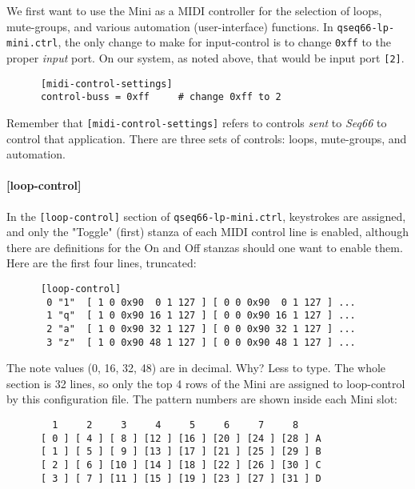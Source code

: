    We first want to use the Mini as a MIDI controller for
   the selection of loops, mute-groups, and various automation (user-interface)
   functions.
   In \texttt{qseq66-lp-mini.ctrl},
   the only change to make for input-control is
   to change \texttt{0xff} to the proper \textsl{input} port.  On our system,
   as noted above, that would be input port \texttt{[2]}.

   \begin{verbatim}
      [midi-control-settings]
      control-buss = 0xff     # change 0xff to 2
   \end{verbatim}

   Remember that \texttt{[midi-control-settings]} refers to controls
   \textsl{sent} to \textsl{Seq66} to control that application.
   There are three sets of controls:  loops, mute-groups, and automation.

\paragraph{[loop-control]}
\label{paragraph:patterns_loop_control}

   In the \texttt{[loop-control]} section of \texttt{qseq66-lp-mini.ctrl},
   keystrokes are assigned, and only the "Toggle" (first)
   stanza of each MIDI control line
   is enabled, although there are definitions for the On and Off stanzas
   should one want to enable them.  Here are the first four lines, truncated:

   \begin{verbatim}
      [loop-control]
       0 "1"  [ 1 0 0x90  0 1 127 ] [ 0 0 0x90  0 1 127 ] ...
       1 "q"  [ 1 0 0x90 16 1 127 ] [ 0 0 0x90 16 1 127 ] ...
       2 "a"  [ 1 0 0x90 32 1 127 ] [ 0 0 0x90 32 1 127 ] ...
       3 "z"  [ 1 0 0x90 48 1 127 ] [ 0 0 0x90 48 1 127 ] ...
   \end{verbatim}

   The note values (0, 16, 32, 48) are in decimal. Why?  Less to type.
   The whole section is 32 lines, so only the top 4 rows of the Mini are
   assigned to loop-control by this configuration file.  The pattern numbers are
   shown inside each Mini slot:

   \begin{verbatim}
        1     2     3     4     5     6     7     8 
      [ 0 ] [ 4 ] [ 8 ] [12 ] [16 ] [20 ] [24 ] [28 ] A
      [ 1 ] [ 5 ] [ 9 ] [13 ] [17 ] [21 ] [25 ] [29 ] B
      [ 2 ] [ 6 ] [10 ] [14 ] [18 ] [22 ] [26 ] [30 ] C
      [ 3 ] [ 7 ] [11 ] [15 ] [19 ] [23 ] [27 ] [31 ] D
   \end{verbatim}


